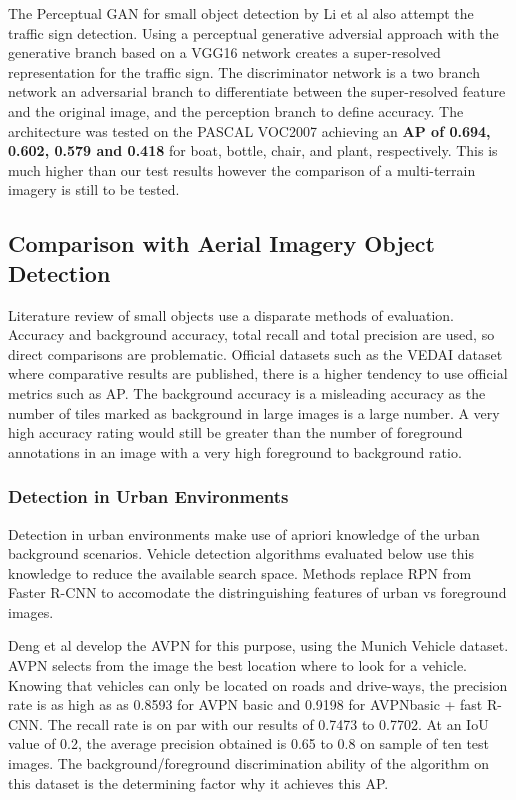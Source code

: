 \documentclass{IEEEtran}
\begin{document}
The Perceptual GAN for small object detection by Li et al \cite{Li2017} also attempt the traffic sign detection. Using a perceptual generative adversial approach with the generative branch based on a VGG16 network creates a super-resolved representation for the traffic sign. The discriminator network is a two branch network an adversarial branch to differentiate between the super-resolved feature and the original image, and the perception branch  to define accuracy. The architecture was tested on the PASCAL VOC2007 achieving an \textbf{AP of 0.694, 0.602, 0.579 and 0.418 } for boat, bottle, chair, and plant, respectively. This is much higher than our test results however the comparison of a multi-terrain imagery is still to be tested.\newline



\subsection{Comparison with Aerial Imagery Object Detection}

Literature review of small objects use a disparate methods of evaluation. Accuracy and background accuracy, total recall and total precision are used, so direct comparisons are problematic. Official datasets such as the VEDAI dataset \cite{razakarivony2016vehicle} where comparative results are published, there is a higher tendency to use official metrics such as AP. The background accuracy is a misleading accuracy as the number of tiles marked as background in large images is a large number. A very high accuracy rating would still be greater than the number of foreground annotations in an image with a very high foreground to background ratio.\newline

\subsubsection{Detection in Urban Environments}

Detection in urban environments make use of apriori knowledge of the urban background scenarios. Vehicle detection algorithms evaluated below use this knowledge to reduce the available search space. Methods replace RPN from Faster R-CNN to accomodate the distringuishing features of urban vs foreground images. \newline

Deng et al \cite{Deng2017} develop the AVPN for this purpose, using the Munich Vehicle dataset. AVPN selects from the image the best location where to look for a vehicle. Knowing that vehicles can only be located on roads and drive-ways,  the precision rate is as high as as 0.8593 for AVPN basic and 0.9198 for AVPNbasic + fast R-CNN. The recall rate is on par with our results of 0.7473 to 0.7702. At an IoU value of 0.2, the average precision obtained is 0.65 to 0.8 on sample of ten test images. The background/foreground discrimination ability of the algorithm on this dataset is the determining factor why it achieves this AP. \newline
\end{document}
